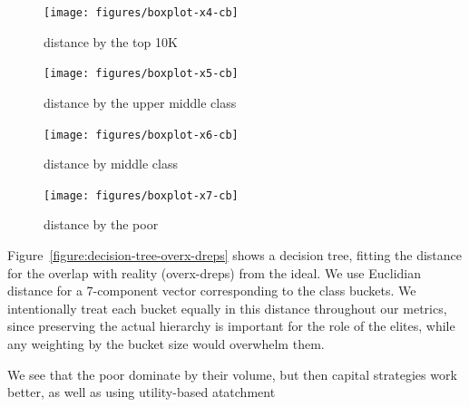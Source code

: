 \documentclass[10pt,oneside]{memoir}
\begin{document}
\begin{Spacing}{2}
\begin{figure}[ht]
\centering
\texttt{[image: figures/boxplot-x4-cb]}
\label{figure:boxplot-x4}
\caption{distance by the top 10K}
\endminipage\hfill%
%
\centering
\texttt{[image: figures/boxplot-x5-cb]}
\label{figure:boxplot-x5}
\caption{distance by the upper middle class}
\endminipage

\bigskip

\centering
\texttt{[image: figures/boxplot-x6-cb]}
\label{figure:boxplot-x6}
\caption{distance by middle class}
\endminipage\hfill%
%
\centering
\texttt{[image: figures/boxplot-x7-cb]}
\label{figure:boxplot-x7}
\caption{distance by the poor}
\endminipage
\end{figure}

Figure~\ref{figure:decision-tree-overx-dreps} shows a decision tree, fitting the distance for the overlap with reality (overx-dreps) from the ideal.  We use Euclidian distance for a 7-component vector corresponding to the class buckets.  We intentionally treat each bucket equally in this distance throughout our metrics, since preserving the actual hierarchy is important for the role of the elites, while any weighting by the bucket size would overwhelm them.


We see that the poor dominate by their volume, but then capital strategies work better, as well as using utility-based atatchment




\end{Spacing}
\end{document}
